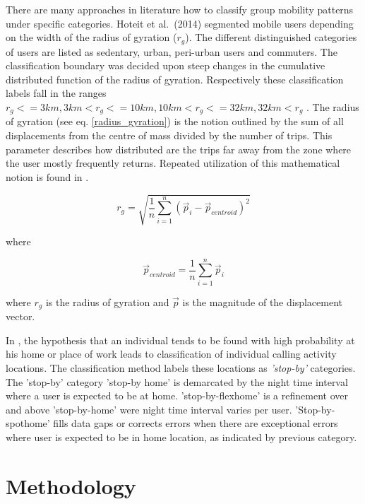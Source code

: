 \documentclass[12pt, a4paper]{report}
\theoremstyle{definition}
\theoremstyle{definition}%
\theoremstyle{definition}%
\theoremstyle{definition}%
\theoremstyle{definition}%
\theoremstyle{definition}%
\begin{document}
There are many approaches in literature how to classify group mobility patterns under specific categories. Hoteit et al.\ (2014) segmented mobile users depending on the width of the radius of gyration (\(r_{g}\)). The different distinguished categories of users are listed as sedentary, urban, peri-urban users and commuters. The classification boundary was decided upon steep changes in the cumulative distributed function of the radius of gyration. Respectively these classification labels fall in the ranges \(r_{g} <= 3km, 3km < r_{g} <= 10km, 10km < r_{g} <= 32km, 32km < r_{g}\) \cite{Hoteit2014}. The radius of gyration (see eq. \ref{radius_gyration}) is the notion outlined by the sum of all displacements from the centre of mass divided by the number of trips. This parameter describes how distributed are the trips far away from the zone where the user mostly frequently returns. Repeated utilization of this mathematical notion is found in \cite{Hoteit2014,Gonzalez2008,Hoteit2016}.

\begin{equation} \label{radius_gyration}
r_{g} = \sqrt{\frac{1}{n}\sum _{i=1}^{n}({\stackrel{\to }{p}}_{i}-{\stackrel{\to }{p}}_{centroid})^2}
\end{equation}

where 

\begin{equation}
{\stackrel{\to }{p}}_{centroid} = \frac{1}{n}\sum _{i=1}^{n}{\stackrel{\to }{p}}_{i}
\end{equation}

where $r_{g}$ is the radius of gyration and ${\stackrel{\to }{p}}$ is the magnitude of the displacement vector.   

In \cite{Hoteit2016}, the hypothesis that an individual tends to be found with high probability at his home or place of work leads to classification of individual calling activity locations. The classification method labels these locations as \textit{'stop-by'} categories. The 'stop-by' category 'stop-by home' is demarcated by the night time interval where a user is expected to be at home. 'stop-by-flexhome' is a refinement over and above 'stop-by-home' were night time interval varies per user. 'Stop-by-spothome' fills data gaps or corrects errors when there are exceptional errors where user is expected to be in home location, as indicated by previous category.



\chapter{Methodology} \label{chapter:methodology}
\end{document}
